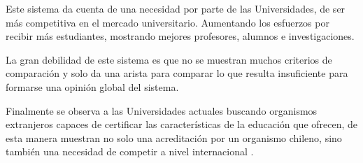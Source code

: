 \documentclass[a4paper,12pt,openany,oneside]{book}
\begin{document}
Este sistema da cuenta de una necesidad por parte de las Universidades, de ser más competitiva en el mercado universitario. Aumentando los esfuerzos por recibir más estudiantes, mostrando mejores profesores, alumnos e investigaciones.

La gran debilidad de este sistema es que no se muestran muchos criterios de comparación y solo da una arista para comparar lo que resulta insuficiente para formarse una opinión global del sistema.

Finalmente se observa a las Universidades actuales buscando organismos extranjeros capaces de certificar las características de la educación que ofrecen, de esta manera muestran no solo una acreditación por un organismo chileno, sino también una necesidad de competir a nivel internacional \cite{data3}.



\end{document}
